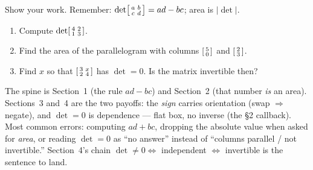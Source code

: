 \documentclass[10pt]{article}
\begin{document}
\begin{practicebox}
Show your work. Remember: $\det\begin{bsmallmatrix} a & b\\ c & d \end{bsmallmatrix}=ad-bc$; area is $|\det|$.
\begin{enumerate}[leftmargin=1.6em, itemsep=4pt]
  \item Compute $\det\begin{bsmallmatrix} 4 & 2\\ 1 & 3 \end{bsmallmatrix}$. 
  \item Find the area of the parallelogram with columns $\begin{bsmallmatrix} 5\\0 \end{bsmallmatrix}$ and $\begin{bsmallmatrix} 2\\3 \end{bsmallmatrix}$. 
  \item Find $x$ so that $\begin{bsmallmatrix} 3 & x\\ 2 & 4 \end{bsmallmatrix}$ has $\det=0$. Is the matrix invertible then? 
\end{enumerate}
\end{practicebox}

\begin{teachernote}
The spine is Section~1 (the rule $ad-bc$) and Section~2 (that number \emph{is} an area). Sections~3
and~4 are the two payoffs: the \emph{sign} carries orientation (swap $\Rightarrow$ negate), and
$\det=0$ is dependence --- flat box, no inverse (the §2 callback). Most common errors: computing
$ad+bc$, dropping the absolute value when asked for \emph{area}, or reading $\det=0$ as ``no answer''
instead of ``columns parallel / not invertible.'' Section~4's chain
$\det\ne0\Leftrightarrow$ independent $\Leftrightarrow$ invertible is the sentence to land.
\end{teachernote}
\end{document}
